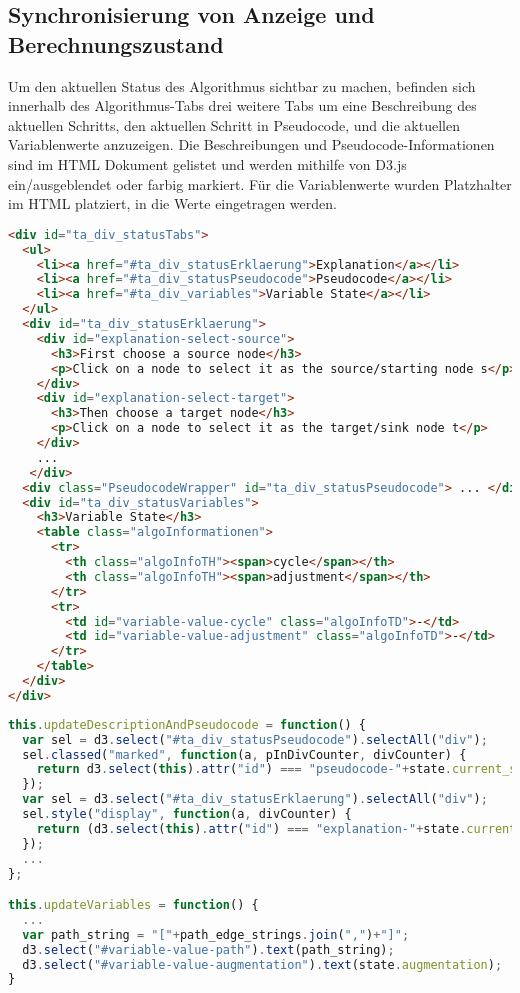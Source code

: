 \subsection{Synchronisierung von Anzeige und Berechnungszustand}

Um den aktuellen Status des Algorithmus sichtbar zu machen, befinden sich innerhalb des Algorithmus-Tabs drei weitere Tabs um eine Beschreibung des aktuellen Schritts, den aktuellen Schritt in Pseudocode, und die aktuellen Variablenwerte anzuzeigen. Die Beschreibungen und Pseudocode-Informationen sind im HTML Dokument gelistet und werden mithilfe von D3.js ein/ausgeblendet oder farbig markiert. Für die Variablenwerte wurden Platzhalter im HTML platziert, in die Werte eingetragen werden.


\begin{lstlisting}[caption=Tabs zur Anzeige des aktuellen Status des Algorithmus, language=HTML]
<div id="ta_div_statusTabs">
  <ul>
    <li><a href="#ta_div_statusErklaerung">Explanation</a></li>
    <li><a href="#ta_div_statusPseudocode">Pseudocode</a></li>
    <li><a href="#ta_div_variables">Variable State</a></li>
  </ul>
  <div id="ta_div_statusErklaerung">
    <div id="explanation-select-source">
      <h3>First choose a source node</h3>
      <p>Click on a node to select it as the source/starting node s</p>
    </div>
    <div id="explanation-select-target">
      <h3>Then choose a target node</h3>
      <p>Click on a node to select it as the target/sink node t</p>
    </div>
    ...
   </div>
  <div class="PseudocodeWrapper" id="ta_div_statusPseudocode"> ... </div>
  <div id="ta_div_statusVariables">
    <h3>Variable State</h3>
    <table class="algoInformationen">
      <tr>
        <th class="algoInfoTH"><span>cycle</span></th>
        <th class="algoInfoTH"><span>adjustment</span></th>
      </tr>
      <tr>
        <td id="variable-value-cycle" class="algoInfoTD">-</td>
        <td id="variable-value-adjustment" class="algoInfoTD">-</td>
      </tr>
    </table>
  </div>
</div>
\end{lstlisting}


\begin{lstlisting}[caption=Anzeige des aktuellen Status, language=Javascript]
this.updateDescriptionAndPseudocode = function() {
  var sel = d3.select("#ta_div_statusPseudocode").selectAll("div");
  sel.classed("marked", function(a, pInDivCounter, divCounter) {
    return d3.select(this).attr("id") === "pseudocode-"+state.current_step;
  });
  var sel = d3.select("#ta_div_statusErklaerung").selectAll("div");
  sel.style("display", function(a, divCounter) {
    return (d3.select(this).attr("id") === "explanation-"+state.current_step) ? "block" : "none";
  });
  ...
};

this.updateVariables = function() {
  ... 
  var path_string = "["+path_edge_strings.join(",")+"]";
  d3.select("#variable-value-path").text(path_string);
  d3.select("#variable-value-augmentation").text(state.augmentation);
}
\end{lstlisting}